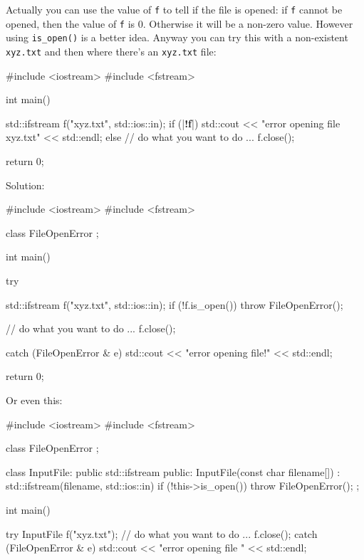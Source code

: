 \begin{consolethree}[escapeinside=||]
Actually you can use the value of \texttt{f} to tell if the file is opened: if \texttt{f} cannot be opened, then the value of \texttt{f} is 0. Otherwise it will be a non-zero value. However using \texttt{is\_open()} is a better idea. Anyway you can try this with a non-existent \texttt{xyz.txt} and then where there's an \texttt{xyz.txt} file:

\begin{consolethree}[escapeinside=||]
#include <iostream>
#include <fstream>

int main()
{   
    std::ifstream f("xyz.txt", std::ios::in);
    if (|\textbf{!f}|)
    {   
         std::cout << "error opening file xyz.txt"
                   << std::endl;
    }
    else
    {    
         // do what you want to do ...
         f.close();
    }

    return 0;

}
\end{consolethree}

Solution:

\begin{console}
#include <iostream>
#include <fstream>

class FileOpenError
{};

int main()
{   
    try
    {   
         std::ifstream f("xyz.txt", std::ios::in);
         if (!f.is_open())
            throw FileOpenError();

         // do what you want to do ...
         f.close();
     }
     catch (FileOpenError & e)
     {   
         std::cout << "error opening file!"
                   << std::endl;
     }

     return 0;
}
\end{console}

Or even this:

\begin{console}
#include <iostream>
#include <fstream>

class FileOpenError
{};

class InputFile: public std::ifstream
{
public:
     InputFile(const char filename[])
       : std::ifstream(filename, std::ios::in)
     {
        if (!this->is_open())
           throw FileOpenError();
     }
};

int main()
{   
    try
    {
        InputFile f("xyz.txt");
        // do what you want to do ...
        f.close();
    }
    catch (FileOpenError & e)
    {   
        std::cout << "error opening file "
                  << std::endl;
    }
    
}
\end{console}
\end{consolethree}
